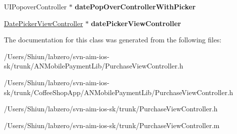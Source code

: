 \begin{DoxyCompactItemize}
\item 
\hypertarget{interface_purchase_view_controller_a0bdf9cf6754cd24ebc473a784c54a8fb}{
UIPopoverController $\ast$ {\bfseries datePopOverControllerWithPicker}}
\label{interface_purchase_view_controller_a0bdf9cf6754cd24ebc473a784c54a8fb}

\item 
\hypertarget{interface_purchase_view_controller_a71d409b28c25a14dd280ef630b6e1b02}{
\hyperlink{interface_date_picker_view_controller}{DatePickerViewController} $\ast$ {\bfseries datePickerViewController}}
\label{interface_purchase_view_controller_a71d409b28c25a14dd280ef630b6e1b02}

\end{DoxyCompactItemize}


The documentation for this class was generated from the following files:\begin{DoxyCompactItemize}
\item 
/Users/Shiun/labzero/svn-\/aim-\/ios-\/sk/trunk/ANMobilePaymentLib/PurchaseViewController.h\item 
/Users/Shiun/labzero/svn-\/aim-\/ios-\/sk/trunk/CoffeeShopApp/ANMobilePaymentLib/PurchaseViewController.h\item 
/Users/Shiun/labzero/svn-\/aim-\/ios-\/sk/trunk/PurchaseViewController.h\item 
/Users/Shiun/labzero/svn-\/aim-\/ios-\/sk/trunk/PurchaseViewController.m\end{DoxyCompactItemize}
